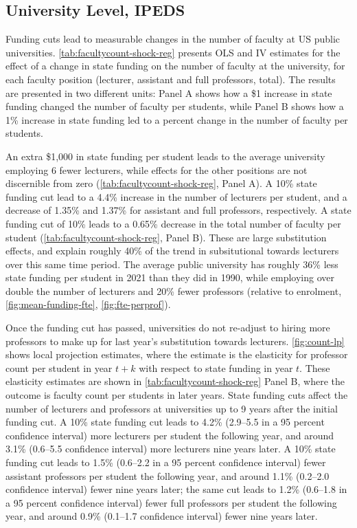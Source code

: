 \subsection{University Level, IPEDS}
\label{sec:results-ipeds}
Funding cuts lead to measurable changes in the number of faculty at US public universities.
\autoref{tab:facultycount-shock-reg} presents OLS and IV estimates for the effect of a change in state funding on the number of faculty at the university, for each faculty position (lecturer, assistant and full professors, total).
The results are presented in two different units: Panel A shows how a \$1 increase in state funding changed the number of faculty per students, while Panel B shows how a 1\% increase in state funding led to a percent change in the number of faculty per students.

An extra \$1,000 in state funding per student leads to the average university employing 6 fewer lecturers, while effects for the other positions are not discernible from zero (\autoref{tab:facultycount-shock-reg}, Panel A).
A 10\% state funding cut lead to a 4.4\% increase in the number of lecturers per student, and a decrease of 1.35\% and 1.37\% for assistant and full professors, respectively.
A state funding cut of 10\% leads to a 0.65\% decrease in the total number of faculty per student (\autoref{tab:facultycount-shock-reg}, Panel B).
These are large substitution effects, and explain roughly 40\% of the trend in subsitutional towards lecturers over this same time period.
The average public university has roughly 36\% less state funding per student in 2021 than they did in 1990, while employing over double the number of lecturers and 20\% fewer professors (relative to enrolment, \autoref{fig:mean-funding-fte}, \ref{fig:fte-perprof}).

Once the funding cut has passed, universities do not re-adjust to hiring more professors to make up for last year's substitution towards lecturers.
\autoref{fig:count-lp} shows local projection estimates, where the estimate is the elasticity for professor count per student in year $t+k$ with respect to state funding in year $t$.
These elasticity estimates are shown in \autoref{tab:facultycount-shock-reg} Panel B, where the outcome is faculty count per students in later years.
State funding cuts affect the number of lecturers and professors at universities up to 9 years after the initial funding cut.
A 10\% state funding cut leads to 4.2\% (2.9--5.5 in a 95 percent confidence interval) more lecturers per student the following year, and around 3.1\% (0.6--5.5 confidence interval) more lecturers nine years later.
A 10\% state funding cut leads to 1.5\% (0.6--2.2 in a 95 percent confidence interval) fewer assistant professors per student the following year, and around 1.1\% (0.2--2.0 confidence interval) fewer nine years later;
the same cut leads to 1.2\% (0.6--1.8 in a 95 percent confidence interval) fewer full professors per student the following year, and around 0.9\% (0.1--1.7 confidence interval) fewer nine years later.

